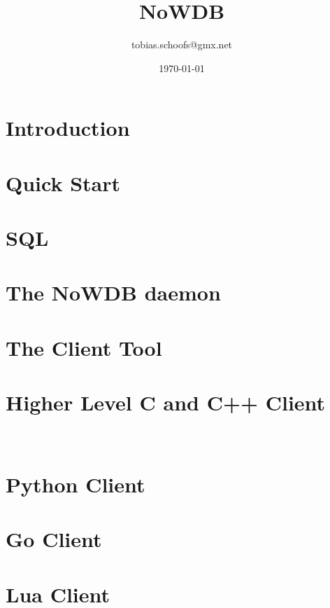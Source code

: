 \documentclass{scrreprt}
\begin{document}
\setlength{\parindent}{0pt}
\setlength{\parskip}{8pt}

\title {NoWDB}
\author {tobias.schoofs@gmx.net}
\date{\today}
\maketitle
\tableofcontents

\chapter{Introduction}\label{chpt_intro} 

\chapter{Quick Start}\label{chpt_quickst}


\chapter{SQL}\label{chpt_sql}


\chapter{The NoWDB daemon}\label{chpt_nowdbd}
\chapter{The Client Tool}\label{chpt_clienttool}

\chapter{Higher Level C and C++ Client}\label{chpt_ccpp}
\CC\

\chapter{Python Client}\label{chpt_pythonclient}


\chapter{Go Client}\label{chpt_goclient}

\chapter{Lua Client}\label{chpt_luaclient}
\end{document}
